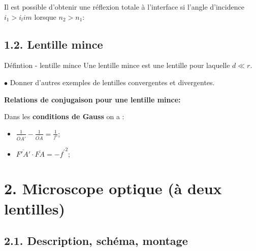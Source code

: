 \documentclass[french, a4paper, 10pt, twocolumn, landscape]{article}
\begin{document}
Il est possible d'obtenir une réflexion totale à l'interface si l'angle d'incidence $i_1>i_lim$ lorsque $n_2>n_1$: 


\subsection*{1.2. Lentille mince}


	\begin{definition}{Défintion - lentille mince}
		Une lentille mince est une lentille pour laquelle $d\ll r$.
	\end{definition}


$\bullet$ Donner d'autres exemples de lentilles convergentes et divergentes.


		\textbf{Relations de conjugaison pour une lentille mince:}\medskip

		Dans les \textbf{conditions de Gauss} on a : 
		\begin{itemize}
		\item $\frac{1}{\overline{OA'}}-\frac{1}{\overline{OA}} = \frac{1}{f'}$;
		\item $\overline{F'A'}\cdot \overline{FA} = -{f^\prime}^2 $;
		\end{itemize}


\section*{2. Microscope optique (à deux lentilles)}
\subsection*{2.1. Description, schéma, montage}

\end{document}
